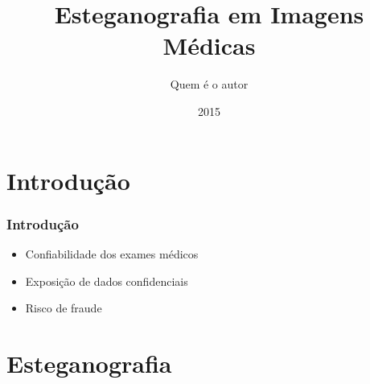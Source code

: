 \documentclass{beamer}
\title{Esteganografia em Imagens Médicas} %
\author{Quem é o autor} %
\institute[USP] %
{
Orientador: Quem? \\ %
\medskip
\textit{} %
}
\date{2015} %
\begin{document}
\begin{frame}
\titlepage %
\end{frame}



\section{Introdução} 

\begin{frame}
\frametitle{Introdução}
\begin{itemize}
\item Confiabilidade dos exames médicos \newline
\item Exposição de dados confidenciais \newline
\item Risco de fraude 

\end{itemize}

\end{frame}


\section{Esteganografia}
\end{document}
